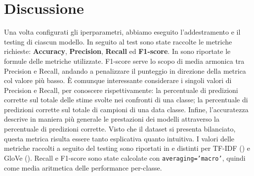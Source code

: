 \documentclass[12pt, a4paper, twoside]{article}
\numberwithin{table}{section}
\begin{document}
    \section{Discussione}
    \label{sec:discussion}
    Una volta configurati gli iperparametri, abbiamo eseguito l'addestramento e il testing di ciascun modello. In seguito al test sono state raccolte le metriche richieste: \textbf{Accuracy}, \textbf{Precision}, \textbf{Recall} ed \textbf{F1-score}. In  sono riportate le formule delle metriche utilizzate.    F1-score serve lo scopo di media armonica tra Precision e Recall, andando a penalizzare il punteggio in direzione della metrica col valore più basso. È comunque interessante considerare i singoli valori di Precision e Recall, per conoscere rispettivamente: la percentuale di predizioni corrette sul totale delle stime svolte nei confronti di una classe; la percentuale di predizioni corrette sul totale di campioni di una data classe.
    Infine, l'accuratezza descrive in maniera più generale le prestazioni dei modelli attraverso la percentuale di predizioni corrette. Visto che il dataset si presenta bilanciato, questa metrica risulta essere tanto esplicativa quanto intuitiva. I valori delle metriche raccolti a seguito del testing sono riportati in  e distinti per TF-IDF () e GloVe (). Recall e F1-score sono state calcolate con \texttt{averaging='macro'}, quindi come media aritmetica delle performance per-classe. 
\end{document}
